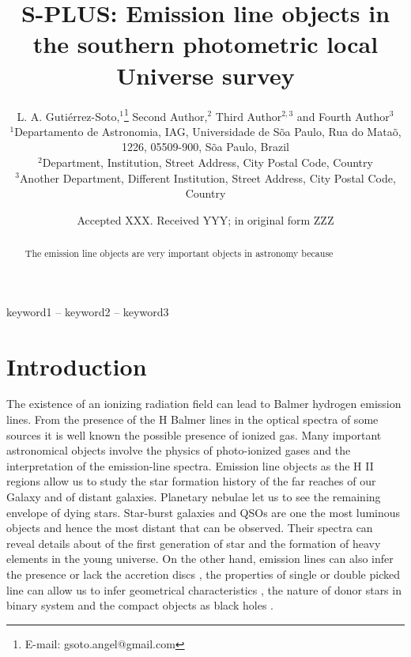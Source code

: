 \documentclass[fleqn,usenatbib]{mnras}
\title[S-PLUS: Emission line objects]{S-PLUS: Emission line objects in the southern photometric local Universe survey}
\author[Guti\'{e}rrez-Soto et al.]{
L. A. Guti\'{e}rrez-Soto,$^{1}$\thanks{E-mail: gsoto.angel@gmail.com}
Second  Author,$^{2}$
Third Author$^{2,3}$
and Fourth Author$^{3}$
\\
$^{1}$Departamento de Astronomia, IAG, Universidade de S\~{o}a Paulo, Rua do Mata\~{o}, 1226, 05509-900, S\~{o}a Paulo, Brazil\\
$^{2}$Department, Institution, Street Address, City Postal Code, Country\\
$^{3}$Another Department, Different Institution, Street Address, City Postal Code, Country
}
\date{Accepted XXX. Received YYY; in original form ZZZ}
\begin{document}
\label{firstpage}
\pagerange{\pageref{firstpage}--\pageref{lastpage}}
\maketitle

\begin{abstract}
The emission line objects are very important objects in astronomy because 
\end{abstract}

\begin{keywords}
keyword1 -- keyword2 -- keyword3
\end{keywords}



\section{Introduction}

The existence of an ionizing radiation field can lead to Balmer hydrogen emission lines. From the presence  of the H Balmer lines in the optical spectra of some sources it is well known the possible presence of ionized gas. Many important astronomical objects involve the physics of photo-ionized gases and the interpretation of the emission-line spectra. Emission line objects as the H II regions allow us to study the star formation history of the far reaches of our Galaxy and of distant galaxies. Planetary nebulae let us to see the remaining envelope of dying stars. Star-burst galaxies and QSOs are one the most luminous objects and hence the most distant that can be observed. Their spectra can reveal details about of the first generation of star and the formation of heavy elements in the young universe. On the other hand, emission lines can also infer the presence or lack the accretion discs \citep{Schwope:2000, Ratti:2012}, the properties of single or double picked line can allow us to infer geometrical characteristics \citep{Horne:1986}, the nature of  donor stars in binary system \citep{Steeghs:2002, Spaandonk:2010, Casares:2015} and the compact objects as black holes \citep{Casares:2016}. 
\end{document}
